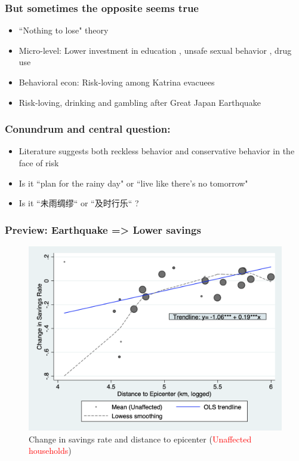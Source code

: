 \documentclass[aspectratio=169]{beamer}
\begin{document}
\begin{frame}
    \frametitle{\LARGE{But sometimes the opposite seems true}}
	\begin{itemize}
		\item ``Nothing to lose" theory \citep{Harris2002} 
		\item Micro-level: Lower investment in education \citep{Fortson2011}, unsafe sexual behavior \citep{Oster2012}, drug use \citep{Gibbons2004}
		\item Behavioral econ: Risk-loving among Katrina evacuees \citep{Eckel2009} 
		\item Risk-loving, drinking and gambling after Great Japan Earthquake \citep{Hanaoka2018}  
	\end{itemize}
\end{frame} 


\begin{frame}
    \frametitle{\LARGE{Conundrum and central question:}}
	\begin{itemize}
		\item Literature suggests both reckless behavior and conservative behavior in the face of risk 
		\item Is it ``plan for the rainy day" or ``live like there's no tomorrow" 
		\item <2-> Is it ``未雨绸缪“  or ``及时行乐“ ?
	\end{itemize}
\end{frame} 

\begin{frame}
	\frametitle{\Large{Preview: Earthquake => Lower savings}}
	\begin{figure}
	    \caption{\small{Change in savings rate and distance to epicenter (\textcolor{red}{Unaffected households})}}
	    \includegraphics[scale=0.35]{pics/incomecons_plot_RAR2draft} 
	\end{figure}
\end{frame}
\end{document}
